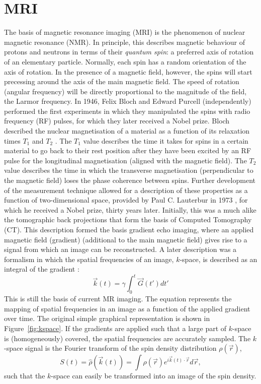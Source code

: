 \section*{MRI}
The basis of magnetic resonance imaging (MRI) is the phenomenon of nuclear magnetic resonance (NMR). In principle, this describes magnetic behaviour of protons and neutrons in terms of their \emph{quantum spin}: a preferred axis of rotation of an elementary particle. Normally, each spin has a random orientation of the axis of rotation. In the presence of a magnetic field, however, the spins will start precessing around the axis of the main magnetic field. The speed of rotation (angular frequency) will be directly proportional to the magnitude of the field, the Larmor frequency. In 1946, Felix Bloch and Edward Purcell (independently) performed the first experiments in which they manipulated the spins with radio frequency (RF) pulses, for which they later received a Nobel prize. Bloch described the nuclear magnetisation of a material as a function of its relaxation times $T_1$ and $T_2$ \cite{Bloch1946}. The $T_1$ value describes the time it takes for spins in a certain material to go back to their rest position after they have been excited by an RF pulse for the longitudinal magnetisation (aligned with the magnetic field). The $T_2$ value describes the time in which the transverse magnetisation (perpendicular to the magnetic field) loses the phase coherence between spins. Further development of the measurement technique allowed for a description of these properties as a function of two-dimensional space, provided by Paul C. Lauterbur in 1973 \cite{Lauterbur1973}, for which he received a Nobel prize, thirty years later. Initially, this was a much alike the tomographic back projections that form the basis of Computed Tomography (CT). This description formed the basis gradient echo imaging, where an applied magnetic field (gradient) (additional to the main magnetic field) gives rise to a signal from which an image can be reconstructed. A later description was a formalism in which the spatial frequencies of an image, $k$-space, is described as an integral of the gradient \cite{Twieg1983,Ljunggren1983}:
\begin{equation}
\vec{k}(t)=\gamma \int_{0}^{t}\vec{G}(t')dt'
\end{equation}
This is still the basis of current MR imaging. The equation represents the mapping of spatial frequencies in an image as a function of the applied gradient over time. The original simple graphical representation is shown in Figure~\ref{fig:kspace}. If the gradients are applied such that a large part of $k$-space is (homogeneously) covered, the spatial frequencies are accurately sampled. The $k$-space signal is the Fourier transform of the spin density distribution $\rho (\vec{r})$, 
\begin{equation}
S(t)=\hat{\rho}(\vec{k}(t))=\int\rho(\vec{r})e^{i \vec{k}(t) \cdot \vec{r}}d\vec{r},
\end{equation}
such that the $k$-space can easily be transformed into an image of the spin density.


